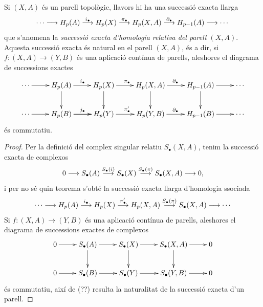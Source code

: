 \documentclass[../main.tex]{subfiles}
\begin{document}
\begin{ter}
Si $(X,A)$ és un parell topològic, llavors hi ha una successió exacta llarga
\begin{equation}
    \notag
    \cdots\longrightarrow H_p(A)\overset{i_\bullet}{\longrightarrow} H_p(X)\overset{\pi_\bullet}{\longrightarrow} H_p(X,A)\overset{\partial_\bullet}{\longrightarrow} H_{p-1}(A)\longrightarrow \cdots
\end{equation}
que s'anomena la \textit{successió exacta d'homologia relativa del parell $(X,A)$}. Aquesta successió exacta és natural en el parell $(X,A)$, és a dir, si $f:(X,A)\rightarrow (Y,B)$ és una aplicació contínua de parells, aleshores el diagrama de successions exactes
\begin{equation}
    \notag
    \xymatrix{
    \cdots\ar[r] & H_p(A)\ar[r]^{i_\bullet}\ar[d] & H_p(X)\ar[r]^{\pi_\bullet}\ar[d] & H_p(X,A)\ar[r]^{\partial_\bullet}\ar[d] & H_{p-1}(A)\ar[r]\ar[d] & \cdots \\
    \cdots\ar[r] & H_p(B)\ar[r]^{j_\bullet}\ar[r]& H_p(Y)\ar[r]^{\pi_\bullet'} & H_p(Y,B)\ar[r]^{\partial_\bullet} & H_{p-1}(B)\ar[r] & \cdots
    }
\end{equation}
és commutatiu.
\end{ter}
\begin{proof}
Per la definició del complex singular relatiu $S_\bullet(X,A)$, tenim la successió exacta de complexos
\begin{equation}
    \notag
    0\longrightarrow S_\bullet(A)\overset{S_\bullet(i)}{\longrightarrow} S_\bullet(X)\overset{S_\bullet(\pi)}{\longrightarrow} S_\bullet(X,A)\longrightarrow 0,
\end{equation}
i per no sé quin teorema s'obté la successió exacta llarga d'homologia ssociada
\begin{equation}
    \notag
    \cdots \longrightarrow H_p(A)\overset{i_\bullet}{\longrightarrow} H_p(X)\overset{\pi_\bullet'}{\longrightarrow} H_p(X,A)\overset{S_\bullet(\pi)}{\longrightarrow} S_\bullet(X,A)\longrightarrow \cdots
\end{equation}
Si $f:(X,A)\rightarrow (Y,B)$ és una aplicació contínua de parells, aleshores el diagrama de successions exactes de complexos
\begin{equation}
    \notag
    \xymatrix{
    0\ar[r] & S_\bullet(A)\ar[d]\ar[r] & S_\bullet(X)\ar[d]\ar[r] & S_\bullet(X,A)\ar[r]\ar[d] & 0 \\
    0 \ar[r] & S_\bullet(B)\ar[r] & S_\bullet(Y)\ar[r] & S_\bullet(Y,B)\ar[r] & 0
    }
\end{equation}
és commutatiu, així de (??) resulta la naturalitat de la successió exacta d'un parell.
\end{proof}
\end{document}
